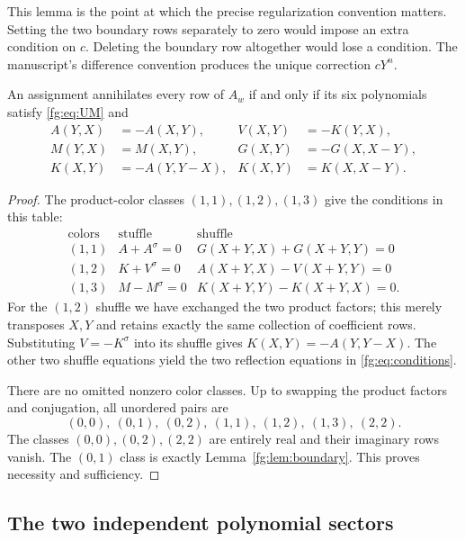 This lemma is the point at which the precise regularization convention
matters. Setting the two boundary rows separately to zero would impose
an extra condition on $c$. Deleting the boundary row altogether would
lose a condition. The manuscript's difference convention produces the
unique correction $cY^n$.

\begin{lemma}\label{fg:lem:conditions}
An assignment annihilates every row of $A_w$ if and only if its six
polynomials satisfy \eqref{fg:eq:UM} and
\begin{align}
 A(Y,X)&=-A(X,Y), & V(X,Y)&=-K(Y,X),\\
 M(Y,X)&=M(X,Y), & G(X,Y)&=-G(X,X-Y),\\
 K(X,Y)&=-A(Y,Y-X),&K(X,Y)&=K(X,X-Y).
 \label{fg:eq:conditions}
\end{align}
\end{lemma}
\begin{proof}
The product-color classes $(1,1),(1,2),(1,3)$ give the conditions in
this table:
\[
\begin{array}{c|c|c}
 \text{colors}&\text{stuffle}&\text{shuffle}\\ \hline
 (1,1)& A+A^\sigma=0
   &G(X+Y,X)+G(X+Y,Y)=0\\
 (1,2)&K+V^\sigma=0
   &A(X+Y,X)-V(X+Y,Y)=0\\
 (1,3)&M-M^\sigma=0
   &K(X+Y,Y)-K(X+Y,X)=0.
\end{array}
\]
For the $(1,2)$ shuffle we have exchanged the two product factors;
this merely transposes $X,Y$ and retains exactly the same collection
of coefficient rows. Substituting $V=-K^\sigma$ into its shuffle gives
$K(X,Y)=-A(Y,Y-X)$. The other two shuffle equations yield the two
reflection equations in \eqref{fg:eq:conditions}.

There are no omitted nonzero color classes. Up to swapping the product
factors and conjugation, all unordered pairs are
\[
 (0,0),\ (0,1),\ (0,2),\ (1,1),\ (1,2),\ (1,3),\ (2,2).
\]
The classes $(0,0),(0,2),(2,2)$ are entirely real and their imaginary
rows vanish. The $(0,1)$ class is exactly
Lemma~\ref{fg:lem:boundary}. This proves necessity and sufficiency.
\end{proof}

\subsection{The two independent polynomial sectors}

